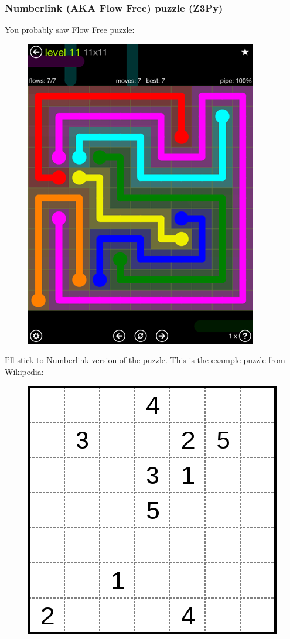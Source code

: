 \subsubsection{Numberlink (\ac{AKA} Flow Free) puzzle (Z3Py)}

You probably saw Flow Free puzzle:

\begin{figure}[H]
\centering
\includegraphics[scale=0.3]{puzzles/numberlink/Z3/flow-extreme-11-11.png}
\caption{}
\end{figure}

I'll stick to Numberlink version of the puzzle. This is the example puzzle from Wikipedia:

\begin{figure}[H]
\centering
\includegraphics[scale=0.3]{puzzles/numberlink/Z3/424px-Numberlink_puzzle.png}
\caption{}
\end{figure}


